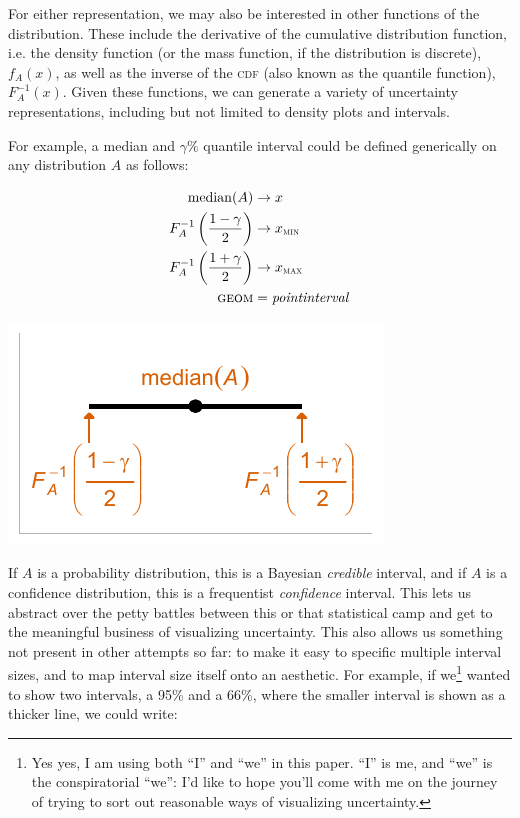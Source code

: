 \documentclass[journal]{vgtc}                     %
\begin{document}
For either representation, we may also be interested in other functions of the distribution. These include the derivative of the cumulative distribution function, i.e. the density function (or the mass function, if the distribution is discrete), $f_A(x)$, as well as the inverse of the \textsc{cdf} (also known as the quantile function), $F_A^{-1}(x)$. Given these functions, we can generate a variety of uncertainty representations, including but not limited to density plots and intervals.

For example, a median and $\gamma\%$ quantile interval could be defined generically on any distribution $A$ as follows:

\begin{minipage}{.5\columnwidth}
\begin{align*}
\operatorname{median}(A) &\rightarrow x\\
F_A^{-1}\left(\frac{1 - \gamma}{2}\right) &\rightarrow x_\textsc{min}\\
F_A^{-1}\left(\frac{1 + \gamma}{2}\right) &\rightarrow x_\textsc{max}\\
\textsc{geom} &= \mathit{pointinterval}
\end{align*}
\end{minipage}%
  \begin{minipage}{.4\columnwidth}
    \centering
    \includegraphics[width=1.2\columnwidth]{figs/3-geom_pointinterval_quantiles.pdf}
  \end{minipage}
\hfill\break

If $A$ is a probability distribution, this is a Bayesian \textit{credible }interval, and if $A$ is a confidence distribution, this is a frequentist \textit{confidence} interval. This lets us abstract over the petty battles between this or that statistical camp and get to the meaningful business of visualizing uncertainty. This also allows us something not present in other attempts so far: to make it easy to specific multiple interval sizes, and to map interval size itself onto an aesthetic. For example, if we\footnote{Yes yes, I am using both ``I'' and ``we'' in this paper. ``I'' is me, and ``we'' is the conspiratorial ``we'': I'd like to hope you'll come with me on the journey of trying to sort out reasonable ways of visualizing uncertainty.} wanted to show two intervals, a 95\% and a 66\%, where the smaller interval is shown as a thicker line, we could write:
\end{document}
